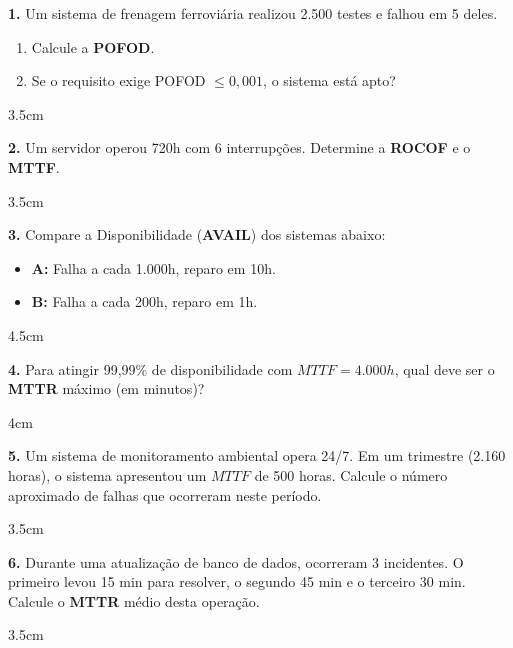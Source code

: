 \documentclass[12pt,a4paper,twoside]{report}
\begin{document}
\vspace{0.4cm}

\textbf{1.} Um sistema de frenagem ferroviária realizou 2.500 testes e falhou em 5 deles. 
\begin{enumerate}[label=\alph*)]
    \item Calcule a \textbf{POFOD}.
    \item Se o requisito exige POFOD $\le 0,001$, o sistema está apto?
\end{enumerate}
\begin{resposta}{3.5cm}
\end{resposta}

\vspace{0.4cm}

\textbf{2.} Um servidor operou 720h com 6 interrupções. Determine a \textbf{ROCOF} e o \textbf{MTTF}.
\begin{resposta}{3.5cm}
\end{resposta}

\vspace{0.4cm}

\textbf{3.} Compare a Disponibilidade (\textbf{AVAIL}) dos sistemas abaixo:
\begin{itemize}
    \item \textbf{A:} Falha a cada 1.000h, reparo em 10h.
    \item \textbf{B:} Falha a cada 200h, reparo em 1h.
\end{itemize}
\begin{resposta}{4.5cm}
\end{resposta}

\vspace{0.4cm}

\textbf{4.} Para atingir 99,99\% de disponibilidade com $MTTF = 4.000h$, qual deve ser o \textbf{MTTR} máximo (em minutos)?
\begin{resposta}{4cm}
\end{resposta}


\textbf{5.} Um sistema de monitoramento ambiental opera 24/7. Em um trimestre (2.160 horas), o sistema apresentou um $MTTF$ de 500 horas. Calcule o número aproximado de falhas que ocorreram neste período.
\begin{resposta}{3.5cm}
\end{resposta}

\vspace{0.5cm}

\textbf{6.} Durante uma atualização de banco de dados, ocorreram 3 incidentes. O primeiro levou 15 min para resolver, o segundo 45 min e o terceiro 30 min. Calcule o \textbf{MTTR} médio desta operação.
\begin{resposta}{3.5cm}
\end{resposta}
\end{document}
